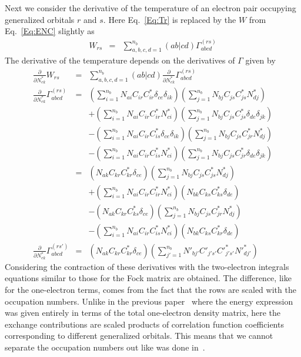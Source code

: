\documentclass[pra]{revtex4-1}
\begin{document}
Next we consider the derivative of the temperature of an electron pair
occupying generalized orbitals $r$ and $s$. Here Eq.~\ref{Eq:Tr} is replaced by
the $W$ from Eq.~\ref{Eq:ENC} slightly as
\begin{eqnarray}
   W_{rs} &=& \sum_{a,b,c,d=1}^{n_b}(ab|cd)\Gamma_{abcd}^{(rs)}
\end{eqnarray}
The derivative of the temperature depends on the derivatives of $\Gamma$ given by
\begin{eqnarray}
  \frac{\partial}{\partial N^{*}_{ek}}W_{rs}
  &=& \sum_{a,b,c,d=1}^{n_b}(ab|cd)
      \frac{\partial}{\partial N^{*}_{ek}}\Gamma_{abcd}^{(rs)} \\
  \frac{\partial}{\partial N^{*}_{ek}}\Gamma_{abcd}^{(rs)}
  &=& \left(\sum_{i=1}^{n_b}N_{ai}C_{ir}C^*_{ir}\delta_{ce}\delta_{ik}\right)
      \left(\sum_{j=1}^{n_b}N_{bj}C_{js}C^*_{js}N^*_{dj}\right) \nonumber \\
  &&+ \left(\sum_{i=1}^{n_b}N_{ai}C_{ir}C^*_{ir}N^*_{ci}\right)
      \left(\sum_{j=1}^{n_b}N_{bj}C_{js}C^*_{js}\delta_{de}\delta_{jk}\right) 
      \nonumber \\
  &&- \left(\sum_{i=1}^{n_b}N_{ai}C_{ir}C^*_{is}\delta_{ce}\delta_{ik}\right)
      \left(\sum_{j=1}^{n_b}N_{bj}C_{js}C^*_{jr}N^*_{dj}\right) \nonumber \\
  &&- \left(\sum_{i=1}^{n_b}N_{ai}C_{ir}C^*_{is}N^*_{ci}\right)
      \left(\sum_{j=1}^{n_b}N_{bj}C_{js}C^*_{jr}\delta_{de}\delta_{jk}\right) \\
  &=& \left(N_{ak}C_{kr}C^*_{kr}\delta_{ce}\right)
      \left(\sum_{j=1}^{n_b}N_{bj}C_{js}C^*_{js}N^*_{dj}\right) \nonumber \\
  &&+ \left(\sum_{i=1}^{n_b}N_{ai}C_{ir}C^*_{ir}N^*_{ci}\right)
      \left(N_{bk}C_{ks}C^*_{ks}\delta_{de}\right) 
      \nonumber \\
  &&- \left(N_{ak}C_{kr}C^*_{ks}\delta_{ce}\right)
      \left(\sum_{j=1}^{n_b}N_{bj}C_{js}C^*_{jr}N^*_{dj}\right) \nonumber \\
  &&- \left(\sum_{i=1}^{n_b}N_{ai}C_{ir}C^*_{is}N^*_{ci}\right)
      \left(N_{bk}C_{ks}C^*_{kr}\delta_{de}\right) \\
  \frac{\partial}{\partial N^{*}_{ek}}\Gamma_{abcd}^{(rs')}
  &=& \left(N_{ak}C_{kr}C^*_{kr}\delta_{ce}\right)
      \left(\sum_{j'=1}^{n_b}N'_{bj'}C'_{j's'}C'^*_{j's'}N'^*_{dj'}\right)
\end{eqnarray}
Considering the contraction of these derivatives with the two-electron integrals
equations similar to those for the Fock matrix are obtained. The difference, like for 
the one-electron terms, comes from the fact that the rows are scaled with the
occupation numbers. Unlike in the previous paper~\cite{van_Dam_2016} where the energy
expression was given entirely in terms of the total one-electron density matrix, here
the exchange contributions are scaled products of correlation function coefficients 
corresponding to different generalized orbitals. This means that we cannot separate
the occupation numbers out like was done in~\cite{van_Dam_2016}.
\end{document}
